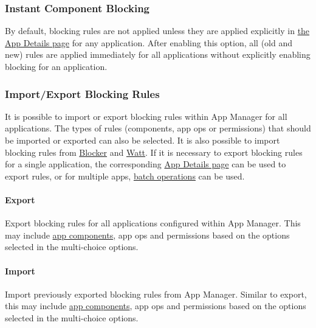 \subsubsection{Instant Component Blocking}\label{subsubsec:instant-component-blocking} %
By default, blocking rules are not applied unless they are applied explicitly in \hyperref[sec:app-details-page]{the App Details page} for any application.
After enabling this option, all (old and new) rules are applied immediately for all applications without explicitly enabling blocking for an application.


\subsubsection{Import/Export Blocking Rules} %
It is possible to import or export blocking rules within App Manager for all applications. The types of rules (components, app ops or permissions) that should be imported or exported can also be selected.
It is also possible to import blocking rules from \href{https://github.com/lihenggui/blocker}{Blocker} and \href{https://github.com/tuyafeng/Watt}{Watt}.
If it is necessary to export blocking rules for a single application, the corresponding \hyperref[sec:app-details-page]{App Details page} can be used to export rules, or for multiple apps, \hyperref[subsec:batch-operations]{batch operations} can be used.


\paragraph{Export} Export blocking rules for all applications configured within App Manager.
This may include \hyperref[subsec:faq:what-are-app-components]{app components}, app ops and permissions based on the options selected in the multi-choice options.

\paragraph{Import} Import previously exported blocking rules from App Manager.
Similar to export, this may include \hyperref[subsec:faq:what-are-app-components]{app components}, app ops and permissions based on the options selected in the multi-choice options.

